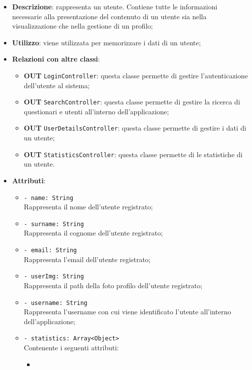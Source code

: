 		\begin{itemize}
			\item \textbf{Descrizione}: rappresenta un utente. Contiene tutte le informazioni necessarie alla presentazione del contenuto di un utente sia nella visualizzazione che nella gestione di un profilo;
			\item \textbf{Utilizzo}: viene utilizzata per memorizzare i dati di un utente;
			\item \textbf{Relazioni con altre classi}: 
			\begin{itemize}
				\item \textbf{OUT} \texttt{LoginController}: questa classe permette di gestire l'autenticazione dell'utente al sistema;
				\item \textbf{OUT} \texttt{SearchController}: questa classe permette di gestire la ricerca di questionari e utenti all'interno dell'applicazione;
				\item \textbf{OUT} \texttt{UserDetailsController}: questa classe permette di gestire i dati di un utente;
				\item \textbf{OUT} \texttt{StatisticsController}: questa classe permette di le statistiche di un utente.
			\end{itemize}
			\item \textbf{Attributi}: 
			\begin{itemize}
				\item 
				\texttt{- name: String}\\
				Rappresenta il nome  dell'utente registrato;
				\item 
				\texttt{- surname: String}\\
				Rappresenta il cognome  dell'utente registrato;
				\item 
				\texttt{- email: String}\\
				Rappresenta l'email  dell'utente registrato;
				\item 
				\texttt{- userImg: String}\\
				Rappresenta il path della foto profilo dell'utente registrato;
				\item 
				\texttt{- username: String}\\ 
				Rappresenta l'username con cui viene identificato l'utente all'interno dell'applicazione;		  		
				\item
				\texttt{- statistics: Array<Object>}\\
				Contenente i seguenti attributi:
				\begin{itemize}
					\item

\end{itemize}
\end{itemize}
\end{itemize}
